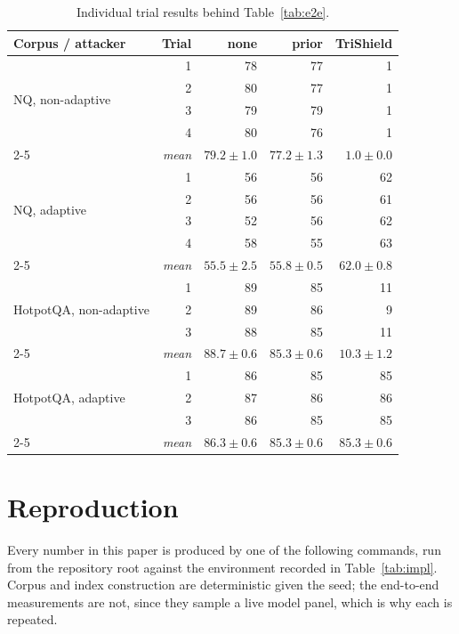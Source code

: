 \begin{table}[t]\centering\small\setlength{\tabcolsep}{7pt}
\begin{tabular}{@{}lrrrr@{}}
\toprule\rowcolor{shieldblueLight}
\textbf{Corpus / attacker} & \textbf{Trial} & \textbf{none} & \textbf{prior} & \textbf{TriShield} \\
\midrule
\multirow{4}{*}{NQ, non-adaptive} & 1 & 78 & 77 & 1 \\
 & 2 & 80 & 77 & 1 \\
 & 3 & 79 & 79 & 1 \\
 & 4 & 80 & 76 & 1 \\
\cmidrule(l){2-5}
 & \emph{mean} & $\mathbf{79.2\pm1.0}$ & $\mathbf{77.2\pm1.3}$ & $\mathbf{1.0\pm0.0}$ \\
\midrule
\multirow{4}{*}{NQ, adaptive} & 1 & 56 & 56 & 62 \\
 & 2 & 56 & 56 & 61 \\
 & 3 & 52 & 56 & 62 \\
 & 4 & 58 & 55 & 63 \\
\cmidrule(l){2-5}
 & \emph{mean} & $\mathbf{55.5\pm2.5}$ & $\mathbf{55.8\pm0.5}$ & $\mathbf{62.0\pm0.8}$ \\
\midrule
\multirow{3}{*}{HotpotQA, non-adaptive} & 1 & 89 & 85 & 11 \\
 & 2 & 89 & 86 & 9 \\
 & 3 & 88 & 85 & 11 \\
\cmidrule(l){2-5}
 & \emph{mean} & $\mathbf{88.7\pm0.6}$ & $\mathbf{85.3\pm0.6}$ & $\mathbf{10.3\pm1.2}$ \\
\midrule
\multirow{3}{*}{HotpotQA, adaptive} & 1 & 86 & 85 & 85 \\
 & 2 & 87 & 86 & 86 \\
 & 3 & 86 & 85 & 85 \\
\cmidrule(l){2-5}
 & \emph{mean} & $\mathbf{86.3\pm0.6}$ & $\mathbf{85.3\pm0.6}$ & $\mathbf{85.3\pm0.6}$ \\
\bottomrule\end{tabular}
\caption{Individual trial results behind Table~\ref{tab:e2e}.}
\label{tab:apptrials}\end{table}

\FloatBarrier
\section{Reproduction}
\label{sec:appE}

Every number in this paper is produced by one of the following commands, run
from the repository root against the environment recorded in
Table~\ref{tab:impl}. Corpus and index construction are deterministic given the
seed; the end-to-end measurements are not, since they sample a live model panel,
which is why each is repeated.

